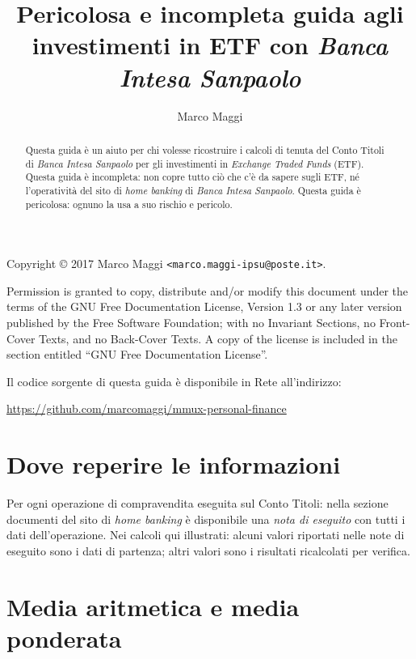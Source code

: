 \documentclass[12pt,a4paper]{article}
\author{Marco Maggi}
\title{Pericolosa e incompleta guida agli investimenti in ETF con \emph{Banca Intesa Sanpaolo}}
\begin{document}
\maketitle

\begin{abstract}
  Questa guida è un  aiuto per chi volesse ricostruire i calcoli  di tenuta del Conto
  Titoli  di \emph{Banca  Intesa  Sanpaolo} per  gli  investimenti in  \emph{Exchange
     Traded Funds} (ETF).  Questa guida è incompleta:  non copre tutto ciò che c'è da
  sapere sugli ETF,  né l'operatività del sito di \emph{home  banking} di \emph{Banca
     Intesa Sanpaolo}.   Questa guida  è pericolosa:  ognuno la usa  a suo  rischio e
  pericolo.
\end{abstract}

\tableofcontents

\newpage{}

\noindent
Copyright \copyright{} 2017 Marco Maggi \texttt{<marco.maggi-ipsu@poste.it>}.

Permission is granted to copy, distribute and/or modify this document under the terms
of the GNU Free Documentation License, Version  1.3 or any later version published by
the Free Software  Foundation; with no Invariant Sections, no  Front-Cover Texts, and
no Back-Cover Texts.  A copy of the license is included in the section entitled ``GNU
Free Documentation License''.

Il codice sorgente di questa guida è disponibile in Rete all'indirizzo:
\begin{center}
  \url{https://github.com/marcomaggi/mmux-personal-finance}
\end{center}

\newpage{}

\section{Dove reperire le informazioni}


Per  ogni  operazione di  compravendita  eseguita  sul  Conto Titoli:  nella  sezione
documenti del sito  di \emph{home banking} è disponibile una  \emph{nota di eseguito}
con  tutti  i  dati  dell'operazione.   Nei calcoli  qui  illustrati:  alcuni  valori
riportati  nelle note  di eseguito  sono  i dati  di  partenza; altri  valori sono  i
risultati ricalcolati per verifica.

\section{Media aritmetica e media ponderata}
\end{document}
